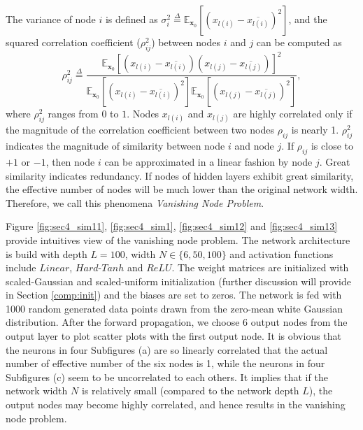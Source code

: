 The variance of node $i$ is defined as $\sigma_i^2\overset{\Delta}{=}\mathbb{E}_{\mathbf{x}_0}[(x_{l(i)}-\overline{x_{l(i)}})^2]$, and the squared correlation coefficient ($\rho_{ij}^2$) between nodes $i$ and $j$ can be 
computed as 
\begin{equation}
\rho_{ij}^2\overset{\Delta}{=}
\frac
{\mathbb{E}_{\mathbf{x}_0}[(x_{l(i)}-\overline{x_{l(i)}})(x_{l(j)}-\overline{x_{l(j)}})]^2}
{\mathbb{E}_{\mathbf{x}_0}[(x_{l(i)}-\overline{x_{l(i)}})^2]\mathbb{E}_{\mathbf{x}_0}[(x_{l(j)}-\overline{x_{l(j)}})^2]},
\end{equation}
where $\rho_{ij}^2$ ranges from $0$ to $1$.
Nodes $x_{l(i)}$ and $x_{l(j)}$ are highly correlated only if the magnitude of the correlation coefficient between two nodes $\rho_{ij}$ is nearly 1. $\rho_{ij}^2$ indicates the magnitude of similarity between node $i$ and node $j$.
If $\rho_{ij}$ is close to $+1$ or $-1$, then node $i$ can be approximated in a linear fashion by node $j$.
Great similarity indicates redundancy.
If nodes of hidden layers exhibit great similarity, the effective number of nodes will be much lower than the original network width.
Therefore, we call this phenomena \textit{Vanishing Node Problem}.

Figure \ref{fig:sec4_sim11}, \ref{fig:sec4_sim1}, \ref{fig:sec4_sim12} and \ref{fig:sec4_sim13}
provide intuitives view of the vanishing node problem. The network
architecture is build with depth $L=100$, width $N\in\{6, 50, 100\}$ and activation functions
include $Linear$, $Hard$-$Tanh$ and $ReLU$.
The weight matrices are initialized with scaled-Gaussian and scaled-uniform initialization
(further discussion will provide in Section \ref{comp:init}) and the biases are set to zeros.
The network is fed with 1000 random generated
data points drawn from the zero-mean white Gaussian distribution. After the forward propagation, we choose
6 output nodes from the output layer to plot scatter plots with the first output node.
It is obvious that the neurons in four Subfigures (a) are so linearly correlated that the
actual number of effective number of the six nodes is 1, while the neurons in four Subfigures (c)
seem to be uncorrelated to each others.
It implies that if the network width $N$ is relatively small (compared to the network depth
$L$), the output nodes may become highly correlated, and hence results in the vanishing node
problem.

% 


